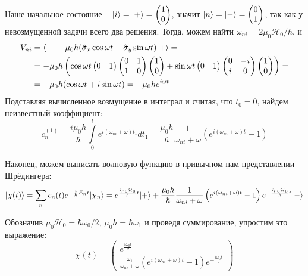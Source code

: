 Наше начальное состояние -- $\lvert i\rangle = \lvert+\rangle=\begin{pmatrix} 1\\0 \end{pmatrix}$, значит $\lvert n\rangle = \lvert-\rangle=\begin{pmatrix} 0\\1 \end{pmatrix}$, так как у невозмущенной задачи всего два решения. Тогда, можем найти
$\omega_{ni}=2\mu_0\mathcal{H}_0/\hbar$, и
\begin{align*}
  V_{ni} &= \langle-\rvert-\mu_0 h(\hat{\sigma}_x\cos\omega t+\hat{\sigma}_y\sin\omega t)\lvert+\rangle = \\ &= -\mu_0 h\left(\cos\omega t\begin{pmatrix}0 & 1\end{pmatrix}\begin{pmatrix} 0 & 1 \\ 1 & 0\end{pmatrix}\begin{pmatrix} 1\\0\end{pmatrix}+\sin\omega t \begin{pmatrix}0 & 1\end{pmatrix}\begin{pmatrix} 0 & -i \\ i & 0\end{pmatrix}\begin{pmatrix} 1\\0\end{pmatrix}\right) = \\ &= -\mu_0 h (\cos\omega t+i\sin\omega t) = -\mu_0 h e^{i\omega t}
\end{align*}
Подставляя вычисленное возмущение в интеграл и считая, что $t_0=0$, найдем
неизвестный коэффициент:
\[
  c_n^{(1)} = \frac{i\mu_0 h}{\hbar}\int\limits_{0}^{t}e^{i(\omega_{ni}+\omega)t_1}dt_1 = \frac{\mu_0 h}{\hbar}\frac{1}{\omega_{ni}+\omega}\left(e^{i(\omega_{ni}+\omega)t}-1\right)
\]

Наконец, можем выписать волновую функцию в привычном нам представлении
Шрёдингера:
\[
  \lvert\chi(t)\rangle = \sum\limits_{n}c_n(t)e^{-\frac{i}{\hbar}E_n t}\lvert\chi_n\rangle = e^{\frac{i\mu_0\mathcal{H}_0}{\hbar}t}\lvert+\rangle+\frac{\mu_0 h}{\hbar}\frac{1}{\omega_{ni}+\omega}\left(e^{i(\omega_{ni}+\omega)t}-1\right)e^{-\frac{i\mu_0\mathcal{H}_0}{\hbar}t}\lvert-\rangle
\]

Обозначив $\mu_0\mathcal{H}_0 = \hbar\omega_0/2$, $\mu_0 h = \hbar\omega_1$ и
проведя суммирование, упростим это выражение:
\[
  \chi(t) = \begin{pmatrix}
    e^{\frac{i\omega_0 t}{2}} \\ \frac{\omega_1}{\omega_{ni}+\omega}(e^{i(\omega_{ni}+\omega)t}-1)e^{-\frac{i\omega_0 t}{2}}
  \end{pmatrix}
\]

